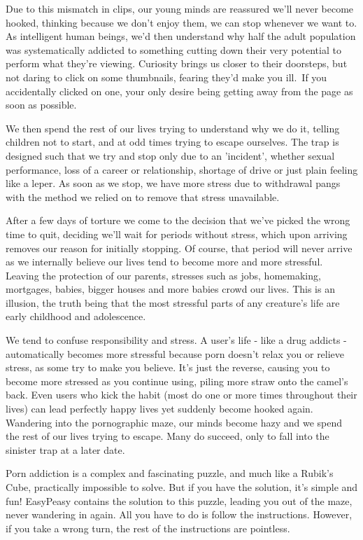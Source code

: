 \documentclass[
]{book}
\begin{document}
Due to this mismatch in clips, our young minds are reassured we'll never become hooked, thinking because we don't enjoy them, we can stop whenever we want to. As intelligent human beings, we'd then understand why half the adult population was systematically addicted to something cutting down their very potential to perform what they're viewing. Curiosity brings us closer to their doorsteps, but not daring to click on some thumbnails, fearing they'd make you ill.~If you accidentally clicked on one, your only desire being getting away from the page as soon as possible.

We then spend the rest of our lives trying to understand why we do it, telling children not to start, and at odd times trying to escape ourselves. The trap is designed such that we try and stop only due to an 'incident', whether sexual performance, loss of a career or relationship, shortage of drive or just plain feeling like a leper. As soon as we stop, we have more stress due to withdrawal pangs with the method we relied on to remove that stress unavailable.

After a few days of torture we come to the decision that we've picked the wrong time to quit, deciding we'll wait for periods without stress, which upon arriving removes our reason for initially stopping. Of course, that period will never arrive as we internally believe our lives tend to become more and more stressful. Leaving the protection of our parents, stresses such as jobs, homemaking, mortgages, babies, bigger houses and more babies crowd our lives. This is an illusion, the truth being that the most stressful parts of any creature's life are early childhood and adolescence.

We tend to confuse responsibility and stress. A user's life - like a drug addicts - automatically becomes more stressful because porn doesn't relax you or relieve stress, as some try to make you believe. It's just the reverse, causing you to become more stressed as you continue using, piling more straw onto the camel's back. Even users who kick the habit (most do one or more times throughout their lives) can lead perfectly happy lives yet suddenly become hooked again. Wandering into the pornographic maze, our minds become hazy and we spend the rest of our lives trying to escape. Many do succeed, only to fall into the sinister trap at a later date.

Porn addiction is a complex and fascinating puzzle, and much like a Rubik's Cube, practically impossible to solve. But if you have the solution, it's simple and fun! EasyPeasy contains the solution to this puzzle, leading you out of the maze, never wandering in again. All you have to do is follow the instructions. However, if you take a wrong turn, the rest of the instructions are pointless.
\end{document}
